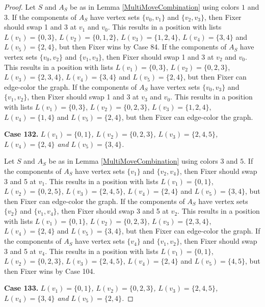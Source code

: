 \documentclass[12pt]{amsart}
\theoremstyle{plain}
\theoremstyle{definition}
\theoremstyle{remark}
\begin{document}
\begin{proof}
Let $S$ and $A_S$ be as in Lemma \ref{MultiMoveCombination} using colors $1$ and $3$. If the components of $A_S$ have vertex sets $\{v_0, v_1\}$ and $\{v_2, v_3\}$, then Fixer should swap 1 and 3 at $v_1$ and $v_0$. This results in a position with lists $L(v_1) = \{0, 3\}$, $L(v_2) = \{0, 1, 2\}$, $L(v_3) = \{1, 2, 4\}$, $L(v_4) = \{3, 4\}$ and $L(v_5) = \{2, 4\}$, but then Fixer wins by Case 84.
If the components of $A_S$ have vertex sets $\{v_0, v_2\}$ and $\{v_1, v_3\}$, then Fixer should swap 1 and 3 at $v_2$ and $v_0$. This results in a position with lists $L(v_1) = \{0, 3\}$, $L(v_2) = \{0, 2, 3\}$, $L(v_3) = \{2, 3, 4\}$, $L(v_4) = \{3, 4\}$ and $L(v_5) = \{2, 4\}$, but then Fixer can edge-color the graph.
If the components of $A_S$ have vertex sets $\{v_0, v_3\}$ and $\{v_1, v_2\}$, then Fixer should swap 1 and 3 at $v_3$ and $v_0$. This results in a position with lists $L(v_1) = \{0, 3\}$, $L(v_2) = \{0, 2, 3\}$, $L(v_3) = \{1, 2, 4\}$, $L(v_4) = \{1, 4\}$ and $L(v_5) = \{2, 4\}$, but then Fixer can edge-color the graph.

\noindent\textbf{Case 132.  }\textit{$L(v_1) = \{0, 1\}$, $L(v_2) = \{0, 2, 3\}$, $L(v_3) = \{2, 4, 5\}$, $L(v_4) = \{2, 4\}$ and $L(v_5) = \{3, 4\}$.}

Let $S$ and $A_S$ be as in Lemma \ref{MultiMoveCombination} using colors $3$ and $5$. If the components of $A_S$ have vertex sets $\{v_1\}$ and $\{v_2, v_4\}$, then Fixer should swap 3 and 5 at $v_1$. This results in a position with lists $L(v_1) = \{0, 1\}$, $L(v_2) = \{0, 2, 5\}$, $L(v_3) = \{2, 4, 5\}$, $L(v_4) = \{2, 4\}$ and $L(v_5) = \{3, 4\}$, but then Fixer can edge-color the graph.
If the components of $A_S$ have vertex sets $\{v_2\}$ and $\{v_1, v_4\}$, then Fixer should swap 3 and 5 at $v_2$. This results in a position with lists $L(v_1) = \{0, 1\}$, $L(v_2) = \{0, 2, 3\}$, $L(v_3) = \{2, 3, 4\}$, $L(v_4) = \{2, 4\}$ and $L(v_5) = \{3, 4\}$, but then Fixer can edge-color the graph.
If the components of $A_S$ have vertex sets $\{v_4\}$ and $\{v_1, v_2\}$, then Fixer should swap 3 and 5 at $v_4$. This results in a position with lists $L(v_1) = \{0, 1\}$, $L(v_2) = \{0, 2, 3\}$, $L(v_3) = \{2, 4, 5\}$, $L(v_4) = \{2, 4\}$ and $L(v_5) = \{4, 5\}$, but then Fixer wins by Case 104.

\noindent\textbf{Case 133.  }\textit{$L(v_1) = \{0, 1\}$, $L(v_2) = \{0, 2, 3\}$, $L(v_3) = \{2, 4, 5\}$, $L(v_4) = \{3, 4\}$ and $L(v_5) = \{2, 4\}$.}


\end{proof}
\end{document}
